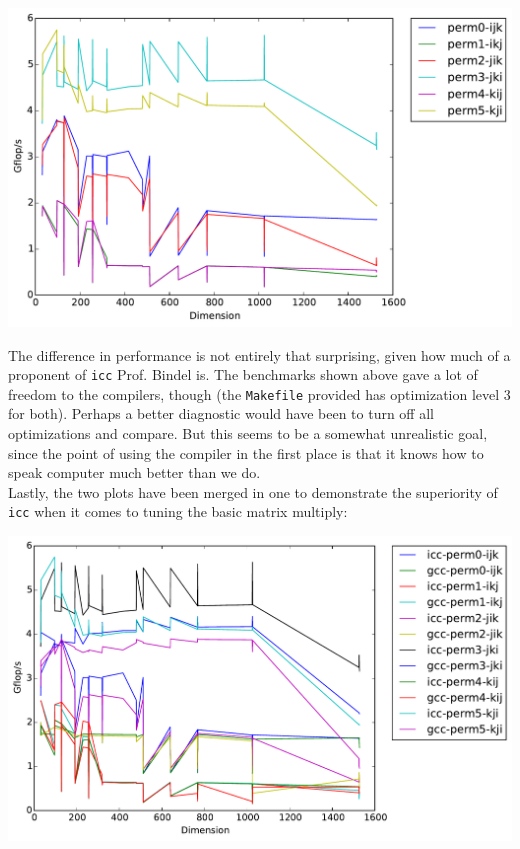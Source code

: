 \documentclass[11pt]{article}
\begin{document}
\begin{center}
    \includegraphics[scale=0.5]{benchmarking/permutations/icc/timing.pdf}
\end{center}

\noindent The difference in performance is not entirely that surprising, given how much of a proponent of \texttt{icc} Prof. Bindel is.  The benchmarks shown above gave a lot of freedom to the compilers, though (the \texttt{Makefile} provided has optimization level 3 for both).  Perhaps a better diagnostic would have been to turn off all optimizations and compare.  But this seems to be a somewhat unrealistic goal, since the point of using the compiler in the first place is that it knows how to speak computer much better than we do.\\

\noindent Lastly, the two plots have been merged in one to demonstrate the superiority of \texttt{icc} when it comes to tuning the basic matrix multiply:

\begin{center}
    \includegraphics[scale=0.5]{benchmarking/permutations/timing_both.pdf}
\end{center}
\end{document}
